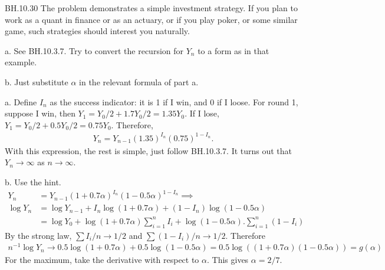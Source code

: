 
\setcounter{theorem}{29}
\begin{exercise} BH.10.30
 The problem demonstrates a simple investment strategy.
If you plan to work as a quant in finance or as an actuary, or if you play poker, or some similar game, such strategies should interest you naturally.

\begin{hint}
a. See BH.10.3.7. Try to convert the recursion for $Y_n$ to a form as in that example.

b. Just substitute $\alpha$ in the relevant formula of part a.
\end{hint}
\begin{solution}
a. Define $I_n$ as the success indicator: it is 1 if I win, and 0 if I loose.  For round 1, suppose I win, then $Y_{1} = Y_0/2 + 1.7 Y_0/2= 1.35 Y_{0}$. If I lose,
$Y_{1} = Y_0/2 + 0.5 Y_0/2= 0.75 Y_{0}$. Therefore,
\begin{align*}
Y_n = Y_{n-1} (1.35)^{I_{n}}(0.75)^{1-I_{n}}.
\end{align*}
With this expression, the rest  is simple, just  follow  BH.10.3.7.
It turns out that $Y_n\to\infty$ as $n\to\infty$.

b. Use the hint.
\begin{align*}
Y_n &= Y_{n-1} (1+0.7\alpha)^{I_{n}}(1-0.5\alpha)^{1-I_{n}} \implies \\
\log Y_n &= \log Y_{n-1}  + I_{n} \log(1+0.7\alpha) + (1-I_{n})\log (1-0.5\alpha)  \\
& = \log Y_{0}  + \log(1+0.7\alpha) \sum_{i=1}^{n}I_{i}  + \log(1-0.5\alpha).\sum_{i=1}^{n} (1-I_{i})
\end{align*}
By the strong law, $\sum I_i/n \to 1/2$ and $\sum (1-I_{i})/n \to 1/2$. Therefore
\begin{align*}
n^{-1}\log Y_n \to 0.5 \log(1+0.7\alpha) + 0.5\log(1-0.5\alpha) = 0.5 \log( (1+0.7\alpha)(1-0.5\alpha)) = g(\alpha)
\end{align*}
For the maximum, take the derivative with respect to $\alpha$. This gives $\alpha=2/7$.
\end{solution}
\end{exercise}


